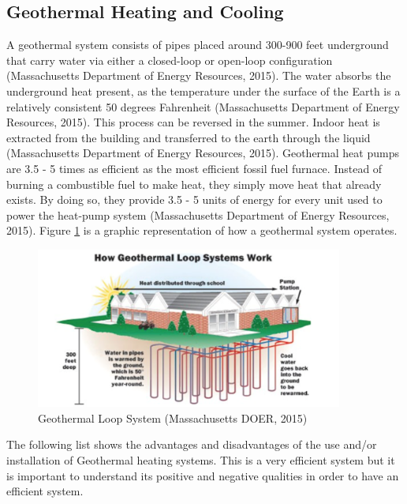     \subsection{Geothermal Heating and Cooling}
    \par A geothermal system consists of pipes placed around 300-900 feet underground that carry water via either a closed-loop or open-loop configuration (Massachusetts Department of Energy Resources, 2015). The water absorbs the underground heat present, as the temperature under the surface of the Earth is a relatively consistent 50 degrees Fahrenheit (Massachusetts Department of Energy Resources, 2015). This process can be reversed in the summer. Indoor heat is extracted from the building and transferred to the earth through the liquid (Massachusetts Department of Energy Resources, 2015). Geothermal heat pumps are 3.5 - 5 times as efficient as the most efficient fossil fuel furnace. Instead of burning a combustible fuel to make heat, they simply move heat that already exists. By doing so, they provide 3.5 - 5 units of energy for every unit used to power the heat-pump system (Massachusetts Department of Energy Resources, 2015). Figure \ref{fig:geo} is a graphic representation of how a geothermal system operates.
    \begin{figure}[h]
      \centering
        \includegraphics[width=0.9\textwidth]{images/04-GeothermalLoopSystem}
      \caption{Geothermal Loop System (Massachusetts DOER, 2015)}
      \label{fig:geo}
    \end{figure}
    \par The following list shows the advantages and disadvantages of the use and/or installation of Geothermal heating systems. This is a very efficient system but it is important to understand its positive and negative qualities in order to have an efficient system.\\
    
